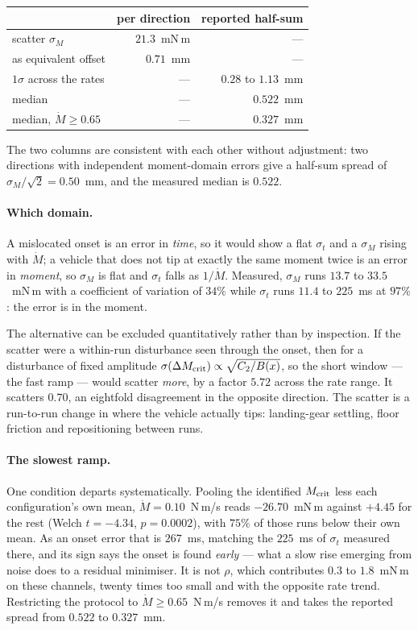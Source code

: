 \documentclass[10pt]{article}
\newcommand{\Mdot}{\dot M}
\begin{document}
\begin{center}\small
\begin{tabular}{@{}lrr@{}}
\toprule
 & per direction & reported half-sum \\
\midrule
scatter $\sigma_M$ & $21.3$~mN\,m & --- \\
as equivalent offset & $0.71$~mm & --- \\
$1\sigma$ across the rates & --- & $0.28$ to $1.13$~mm \\
median & --- & $0.522$~mm \\
median, $\Mdot\ge0.65$ & --- & $0.327$~mm \\
\bottomrule
\end{tabular}
\end{center}

The two columns are consistent with each other without adjustment: two
directions with independent moment-domain errors give a half-sum spread
of $\sigma_M/\sqrt2 = 0.50$~mm, and the measured median is $0.522$.

\paragraph{Which domain.} A mislocated onset is an error in \emph{time},
so it would show a flat $\sigma_t$ and a $\sigma_M$ rising with $\Mdot$;
a vehicle that does not tip at exactly the same moment twice is an error
in \emph{moment}, so $\sigma_M$ is flat and $\sigma_t$ falls as
$1/\Mdot$. Measured, $\sigma_M$ runs $13.7$ to $33.5$~mN\,m with a
coefficient of variation of $34\%$ while $\sigma_t$ runs $11.4$ to
$225$~ms at $97\%$: the error is in the moment.

The alternative can be excluded quantitatively rather than by
inspection. If the scatter were a within-run disturbance seen through
the onset, then for a disturbance of fixed amplitude
$\sigma(\Delta M_{\rm crit}) \propto \sqrt{C_2/B(x)}$, so the short
window --- the fast ramp --- would scatter \emph{more}, by a factor
$5.72$ across the rate range. It scatters $0.70$, an eightfold
disagreement in the opposite direction. The scatter is a run-to-run
change in where the vehicle actually tips: landing-gear settling, floor
friction and repositioning between runs.

\paragraph{The slowest ramp.} One condition departs systematically.
Pooling the identified $M_{\rm crit}$ less each configuration's own mean,
$\Mdot = 0.10$~N\,m/s reads $-26.70$~mN\,m against $+4.45$ for the rest
(Welch $t = -4.34$, $p = 0.0002$), with $75\%$ of those runs below their
own mean. As an onset error that is $267$~ms, matching the $225$~ms of
$\sigma_t$ measured there, and its sign says the onset is found
\emph{early} --- what a slow rise emerging from noise does to a residual
minimiser. It is not $\rho$, which contributes $0.3$ to $1.8$~mN\,m on
these channels, twenty times too small and with the opposite rate trend.
Restricting the protocol to $\Mdot\ge0.65$~N\,m/s removes it and takes
the reported spread from $0.522$ to $0.327$~mm.
\end{document}
